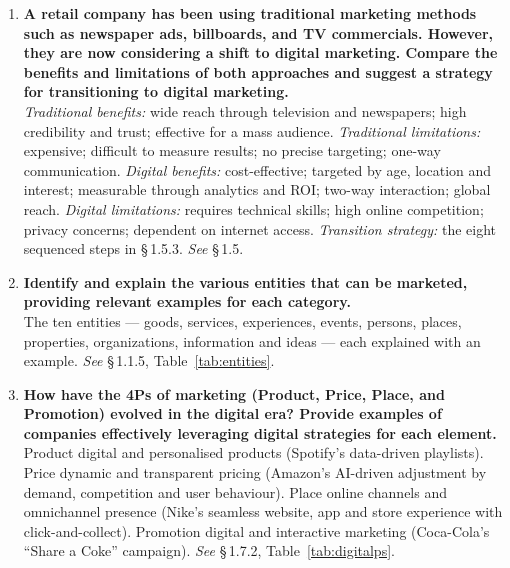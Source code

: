 \documentclass{MMTextbook}
\begin{document}
\begin{enumerate}[leftmargin=2.2em,itemsep=1.4ex]
\item \textbf{A retail company has been using traditional marketing methods such
      as newspaper ads, billboards, and TV commercials. However, they are now
      considering a shift to digital marketing. Compare the benefits and
      limitations of both approaches and suggest a strategy for transitioning to
      digital marketing.}
      \\
      \emph{Traditional benefits:} wide reach through television and newspapers;
      high credibility and trust; effective for a mass audience.
      \emph{Traditional limitations:} expensive; difficult to measure results;
      no precise targeting; one-way communication. \emph{Digital benefits:}
      cost-effective; targeted by age, location and interest; measurable through
      analytics and ROI; two-way interaction; global reach. \emph{Digital
      limitations:} requires technical skills; high online competition; privacy
      concerns; dependent on internet access. \emph{Transition strategy:} the
      eight sequenced steps in \S\,1.5.3.
      \hfill\emph{See} \S\,1.5.

\item \textbf{Identify and explain the various entities that can be marketed,
      providing relevant examples for each category.}
      \\
      The ten entities --- goods, services, experiences, events, persons, places,
      properties, organizations, information and ideas --- each explained with an
      example. \hfill\emph{See} \S\,1.1.5, Table~\ref{tab:entities}.

\item \textbf{How have the 4Ps of marketing (Product, Price, Place, and
      Promotion) evolved in the digital era? Provide examples of companies
      effectively leveraging digital strategies for each element.}
      \\
      Product \ra{} digital and personalised products (Spotify's data-driven
      playlists). Price \ra{} dynamic and transparent pricing (Amazon's
      AI-driven adjustment by demand, competition and user behaviour). Place
      \ra{} online channels and omnichannel presence (Nike's seamless website,
      app and store experience with click-and-collect). Promotion \ra{} digital
      and interactive marketing (Coca-Cola's ``Share a Coke'' campaign).
      \hfill\emph{See} \S\,1.7.2, Table~\ref{tab:digitalps}.


\end{enumerate}
\end{document}
